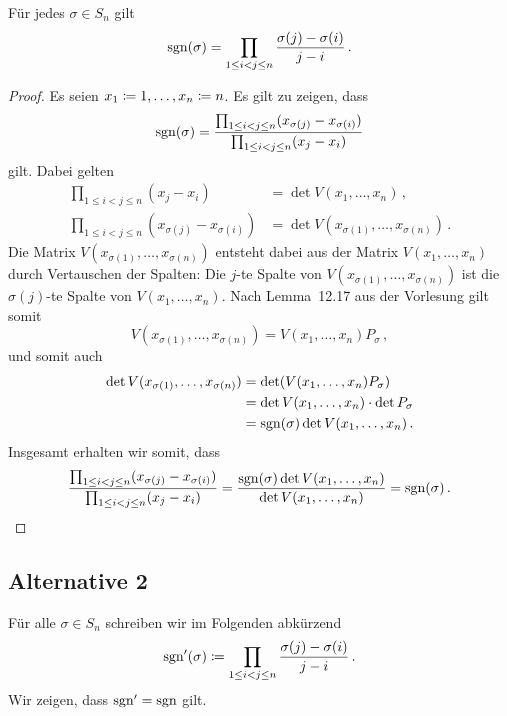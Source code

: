 \begin{theorem}
  \label{theorem: sign formula}
  Für jedes $\sigma \in S_n$ gilt
  \[
      \operatorname{sgn}(\sigma)
    = \prod_{1 \leq i < j \leq n} \frac{\sigma(j) - \sigma(i)}{j - i} \,.
  \]
\end{theorem}

\begin{proof}
  Es seien $x_1 \coloneqq 1, \dotsc, x_n \coloneqq n$.
  Es gilt zu zeigen, dass
  \[
      \operatorname{sgn}(\sigma)
    = \frac{\prod_{1 \leq i < j \leq n} (x_{\sigma(j)} - x_{\sigma(i)})}{\prod_{1 \leq i < j \leq n} (x_j - x_i)}
  \]
  gilt.
  Dabei gelten
  \begin{align*}
        \prod_{1 \leq i < j \leq n} (x_j - x_i)
    &=  \det V(x_1, \dotsc, x_n) \,,
    \\
        \prod_{1 \leq i < j \leq n} (x_{\sigma(j)} - x_{\sigma(i)})
    &=  \det V(x_{\sigma(1)}, \dotsc, x_{\sigma(n)}) \,.
  \end{align*}
  Die Matrix $V(x_{\sigma(1)}, \dotsc, x_{\sigma(n)})$ entsteht dabei aus der Matrix $V(x_1, \dotsc, x_n)$ durch Vertauschen der Spalten:
  Die $j$-te Spalte von $V(x_{\sigma(1)}, \dotsc, x_{\sigma(n)})$ ist die $\sigma(j)$-te Spalte von $V(x_1, \dotsc, x_n)$.
  Nach Lemma~12.17 aus der Vorlesung gilt somit
  \[
      V(x_{\sigma(1)}, \dotsc, x_{\sigma(n)})
    = V(x_1, \dotsc, x_n) P_{\sigma} \,,
  \]
  und somit auch
  \begin{align*}
        \det V(x_{\sigma(1)}, \dotsc, x_{\sigma(n)})
    &=  \det( V(x_1, \dotsc, x_n) P_\sigma )  \\
    &=  \det V(x_1, \dotsc, x_n) \cdot \det P_{\sigma}  \\
    &=  \operatorname{sgn}(\sigma) \det V(x_1, \dotsc, x_n) \,.
  \end{align*}
  Insgesamt erhalten wir somit, dass
  \[
      \frac{\prod_{1 \leq i < j \leq n} (x_{\sigma(j)} - x_{\sigma(i)})}{\prod_{1 \leq i < j \leq n} (x_j - x_i)}
    = \frac{\operatorname{sgn}(\sigma) \det V(x_1, \dotsc, x_n)}{\det V(x_1, \dotsc, x_n)}
    = \operatorname{sgn}(\sigma) \,.
  \]
\end{proof}





\subsection*{Alternative 2}

Für alle $\sigma \in S_n$ schreiben wir im Folgenden abkürzend
\[
            \operatorname{sgn}'(\sigma)
  \coloneqq  \prod_{1 \leq i < j \leq n} \frac{\sigma(j) - \sigma(i)}{j - i} \,.
\]
Wir zeigen, dass $\operatorname{sgn}' = \operatorname{sgn}$ gilt.




